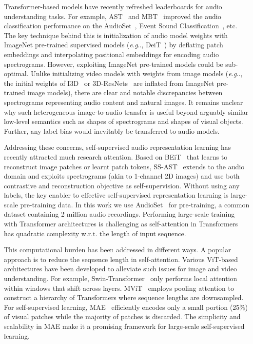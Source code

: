 \documentclass{article}
\makeatletter
\DeclareRobustCommand\onedot{\futurelet\@let@token\@onedot}
\def\@onedot{\ifx\@let@token.\else.\null\fi\xspace}
\def\eg{\emph{e.g}\onedot} \def\Eg{\emph{E.g}\onedot}
\makeatother
\begin{document}
Transformer-based models have recently refreshed leaderboards for audio understanding tasks.
For example, AST~\cite{gong2021ast} and MBT~\cite{Nagrani21c} improved the audio classification performance on the  AudioSet~\cite{gemmeke2017audio}, Event Sound Classification~\cite{piczak2015dataset}, etc.
The key technique behind this is initialization of audio model weights with ImageNet pre-trained supervised models (\eg, DeiT~\cite{touvron2021training})
by deflating patch embeddings and interpolating positional embeddings for encoding audio spectrograms.
However, exploiting ImageNet pre-trained models could be sub-optimal.
Unlike initializing video models with weights from image models (\eg, the initial weights of I3D~\cite{i3d} or 3D-ResNets~\cite{feichtenhofer2016spatiotemporal} are inflated from ImageNet pre-trained image models), there are clear and notable discrepancies between spectrograms representing audio content and natural images.
It remains unclear why such heterogeneous image-to-audio transfer is useful beyond arguably similar low-level semantics such as shapes of spectrograms and shapes of visual objects. 
Further, any label bias would inevitably be transferred to audio models.

Addressing these concerns, self-supervised audio representation learning has recently attracted much research attention. 
Based on BEiT~\cite{beit} that learns to reconstruct image patches or learnt patch tokens, SS-AST~\cite{ssast} extends to the audio domain and exploits spectrograms (akin to 1-channel 2D images) and use both contrastive and reconstruction objective as self-supervision. 
Without using any labels, the key enabler to effective self-supervised representation learning is large-scale pre-training data.
In this work we use AudioSet~\cite{gemmeke2017audio} for pre-training, a common dataset containing 2 million audio recordings.
Performing large-scale training with Transformer architectures is challenging as self-attention in Transformers has quadratic complexity w.r.t. the length of input sequence.


This computational burden has been addressed in different ways. A popular approach is to reduce the sequence length in self-attention. 
Various ViT-based architectures have been developed to alleviate such issues for image and video understanding.
For example, Swin-Transformer~\cite{swin} only performs local attention within windows that shift across layers.
MViT~\cite{maskedfeat} employs pooling attention to construct a hierarchy of Transformers where sequence lengths are downsampled.
For self-supervised learning, MAE~\cite{mae} efficiently encodes only a small portion (25\%) of visual patches while the majority of patches is discarded.
The simplicity and scalability in MAE make it a promising framework for large-scale self-supervised learning.
\end{document}
